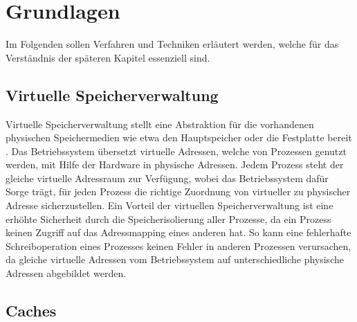 \chapter{Grundlagen}
\label{chapter:basics}

Im Folgenden sollen Verfahren und Techniken erläutert werden, welche für das Verständnis der späteren Kapitel essenziell sind.  


\section{Virtuelle Speicherverwaltung}

Virtuelle Speicherverwaltung stellt eine Abstraktion für die vorhandenen physischen Speichermedien wie etwa den Hauptspeicher oder die Festplatte bereit \cite{tanenbaumVirtualMemory}.
Das Betriebssystem übersetzt virtuelle Adressen, welche von Prozessen genutzt werden, mit Hilfe der Hardware in physische Adressen. 
Jedem Prozess steht der gleiche virtuelle Adressraum zur Verfügung, wobei das Betriebssystem dafür Sorge trägt, für jeden Prozess die richtige Zuordnung von virtueller zu physischer Adresse sicherzustellen.
Ein Vorteil der virtuellen Speicherverwaltung ist eine erhöhte Sicherheit durch die Speicherisolierung aller Prozesse, da ein Prozess keinen Zugriff auf das Adressmapping eines anderen hat.
So kann eine fehlerhafte Schreiboperation eines Prozesses keinen Fehler in anderen Prozessen verursachen, da gleiche virtuelle Adressen vom Betriebssystem auf unterschiedliche physische Adressen abgebildet werden.

\section{Caches}

